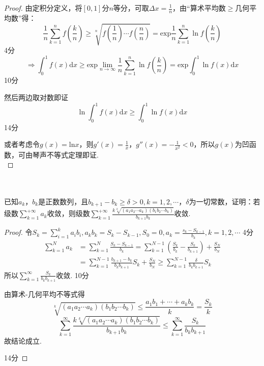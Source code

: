 \documentclass[hideanswer=false,
	enfont=newtxtext,
	zhfont=empty,
	mathfont=newtxmath,
]{cmcthesis}
\begin{document}
	\begin{answer}
	\begin{proof}
由定积分定义，将$[0,1]$分$n$等分，可取$\Delta x=\frac{1}{n}$，由“算术平均数$\geq$几何平均数”得：
	\[
	\frac{1}{n}\sum_{k=1}^n{f\left(\frac{k}{n}\right)\geq\sqrt[n]{f\left(\frac{1}{n}\right)\cdots f\left(\frac{n}{n}\right)}}=\mathrm{exp}{\frac{1}{n}\sum_{k=1}^n{\ln f\left(\frac{k}{n}\right)}}
	\]
\hfill\dotfill 4分
	\[
	\Rightarrow\int_0^1{f\left(x\right)}\mathrm{d}x\geq \mathrm{exp}{\lim_{n\rightarrow\infty}\frac{1}{n}\sum_{k=1}^n{\ln f\left(\frac{k}{n}\right)}}=\mathrm{exp}{\int_0^1{\ln f\left(x\right)}}\mathrm{d}x
	\]
\hfill\dotfill 10分

然后两边取对数即证
	\[
	\ln\int_0^1{f\left(x\right)\mathrm{d}x\geq\int_0^1{\ln f\left(x\right)\mathrm{d}x}}
	\]
\hfill\dotfill 14分

或者考虑令$g(x)=\mathrm {ln}x$，则$g'\left(x\right)= \frac{1}{x}$，$g''\left(x\right)=-\frac{1}{x^2}<0$，所以$g(x)$为凹函数，可由琴声不等式定理即证.\\
	\end{proof}
	\end{answer}




\\\\
已知${a_k}$，${b_k}$是正数数列，且$b_{k+1}-b_k\geq\delta >0,k=1,2,\cdots $，$\delta$为一切常数，证明：若级数$\sum_{k=1}^{+\infty}{a_k}$收敛，则级数$\sum_{k=1}^{+\infty}{\frac{k\sqrt[k]{\left(a_1a_2\cdots a_k\right)\left(b_1b_2\cdots b_k\right)}}{b_{k+1}b_k}}$收敛.
	\begin{answer}
	\begin{proof}
令$S_k=\sum_{i=1}^k{a_i}b_i,a_kb_k=S_k-S_{k-1},S_0=0,a_k=\frac{s_k-S_{k-1}}{b_k},k=1,2,\cdots $
\hfill\dotfill 4分
\begin{align*} 
	\sum_{k=1}^N{a}_k
	&		=\sum_{k=1}^N{\frac{S_k-S_{k-1}}{b_k}}=\sum_{k=1}^{N-1}{\left(\frac{S_k}{b_k}-\frac{S_k}{b_{k+1}}\right)}+\frac{S_N}{b_N}\\
 	&=\sum_{k=1}^{N-1}{\frac{b_{k+1}-b_k}{b_kb_{k+1}}}S_k+\frac{S_N}{b_N}\geq\sum_{k=1}^{N-1}{\frac{\delta}{b_kb_{k+1}}}S_k
\end{align*}
所以$\sum_{k=1}^{\infty}{\frac{S_k}{b_kb_{k+1}}}$收敛.
\hfill\dotfill 10分

由算术-几何平均不等式得
	\[
	\sqrt[k]{\left(a_1a_2\cdots a_k\right)\left(b_1b_2\cdots b_k\right)}\leq\frac{a_1b_1+\cdots +a_kb_k}{k}=\frac{S_k}{k}
	\]
	\[
	\sum_{k=1}^{\infty}{\frac{k\sqrt[k]{\left(a_1a_2\cdots a_k\right)\left(b_1b_2\cdots b_k\right)}}{b_{k+1}b_k}}\leq\sum_{k=1}^{\infty}{\frac{S_k}{b_kb_{k+1}}}
	\]
故结论成立.

\hfill\dotfill 14分
	\end{proof}
	\end{answer}

\mbox{}


\end{document}
